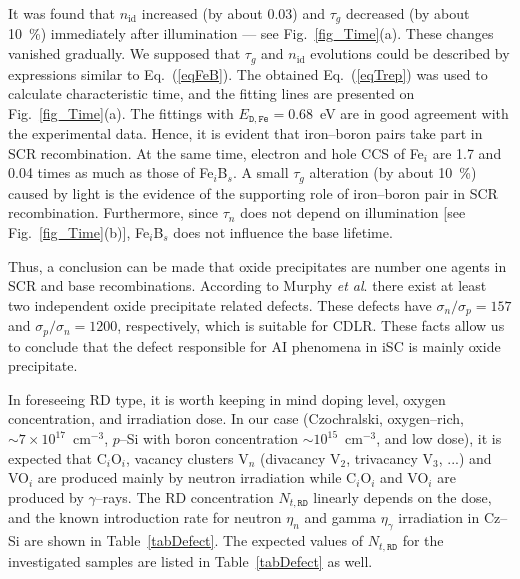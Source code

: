 \documentclass[aip,jap, amsmath,amssymb,reprint]{revtex4-1}
\begin{document}
It was found that $n_{\mathrm{id}}$ increased (by about 0.03) and $\tau_g$ decreased (by about 10~\%) immediately after illumination --- see Fig.~\ref{fig_Time}(a).
These changes vanished gradually.
We supposed that $\tau_g$ and $n_{\mathrm{id}}$ evolutions could be described by expressions similar to Eq.~(\ref{eqFeB}).
The obtained Eq.~(\ref{eqTrep}) was used to calculate characteristic time, and the fitting lines are presented on Fig.~\ref{fig_Time}(a).
The fittings with $E_{\mathtt{D,Fe}}=0.68$~eV are in good agreement with the experimental data.
Hence, it is evident that iron--boron pairs take part in SCR recombination.
At the same time, electron and hole CCS of Fe$_i$ are 1.7 and 0.04 times \cite{MurphyJAP2011} as much as those of Fe$_i$B$_s$.
A small $\tau_g$ alteration (by about 10~\%) caused by light is the evidence of the supporting role of iron--boron pair in SCR recombination.
Furthermore, since $\tau_n$ does not depend on illumination [see Fig.~\ref{fig_Time}(b)], Fe$_i$B$_s$ does not influence the base lifetime.

Thus, a conclusion can be made that oxide precipitates are number one agents in SCR and base recombinations.
According to Murphy \emph{et al}.\cite{MurphySC2014,MurphyJAP2012}
there exist at least two independent oxide precipitate related defects.
These defects have $\sigma_n/\sigma_p=157$ and $\sigma_p/\sigma_n=1200$, respectively,\cite{MurphyJAP2012} which is suitable for CDLR.
These facts allow us to conclude that the defect responsible for AI phenomena in iSC is mainly oxide precipitate.

In foreseeing RD type, it is worth keeping in mind doping level, oxygen concentration, and irradiation dose.
In our case (Czochralski, oxygen--rich, $\sim7\times10^{17}$~cm$^{-3}$, $p$--Si with boron concentration $\sim10^{15}$~cm$^{-3}$, and low dose),
it is expected that C$_i$O$_i$, vacancy clusters V$_n$ (divacancy V$_2$, trivacancy V$_3$, ...) and VO$_i$
are produced mainly by neutron irradiation \cite{n:long,n:gamma,Moll:PhD}
while C$_i$O$_i$ and  VO$_i$ are produced by $\gamma$--rays.\cite{gamma:Stahl,Moll:PhD,gamma:Kolk,A:Caracas}
The RD concentration $N_{t,\mathtt{RD}}$ linearly depends on the dose,
and the known introduction rate for neutron $\eta_n$ and gamma $\eta_\gamma$ irradiation in Cz--Si are shown in Table~\ref{tabDefect}.
The expected values of $N_{t,\mathtt{RD}}$ for the investigated samples are listed in Table~\ref{tabDefect} as well.
\end{document}
